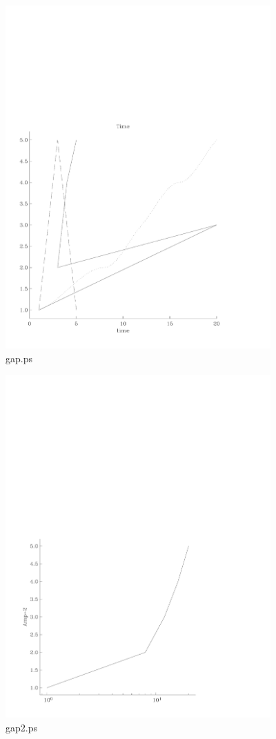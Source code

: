 \documentclass{article}
\begin{document}
\begin{figure}[htbp]
\begin{center}
\includegraphics[width=4in]{gap3}
\caption{gap.ps}
\label{fig:gap.ps}
\end{center}
\end{figure}
\begin{figure}[htbp]
\begin{center}
\includegraphics[width=4in]{gap4}
\caption{gap2.ps}
\label{fig:gap2.ps}
\end{center}
\end{figure}
\end{document}
